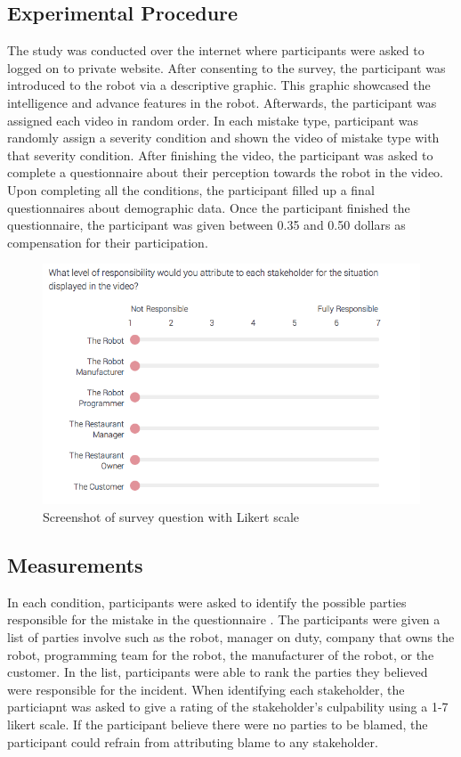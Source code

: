 \documentclass{sigchi}
\begin{document}
\subsection{Experimental Procedure}
The study was conducted over the internet where participants were asked to logged on to private website. After consenting to the survey, the participant was introduced to the robot via a descriptive graphic. This graphic showcased the intelligence and advance features in the robot. Afterwards, the participant was assigned each video in random order. In each mistake type, participant was randomly assign a severity condition and shown the video of mistake type with that severity condition. After finishing the video, the participant was asked to complete a questionnaire about their perception towards the robot in the video. Upon completing all the conditions, the participant filled up a final questionnaires about demographic data. Once the participant finished the questionnaire, the participant was given between 0.35 and 0.50 dollars as compensation for their participation.

\begin{figure}[!h]
\centering
\includegraphics[width=0.9\columnwidth]{Survey}
\caption{Screenshot of survey question with Likert scale}
\label{fig:figure4}
\end{figure}

\subsection{Measurements}
In each condition, participants were asked to identify the possible parties responsible for the mistake in the questionnaire . The participants were given a list of parties involve such as the robot, manager on duty, company that owns the robot, programming team for the robot, the manufacturer of the robot, or the customer. In the list, participants were able to rank the parties they believed were responsible for the incident. When identifying each stakeholder, the particiapnt was asked to give a rating of the stakeholder's culpability using a 1-7 likert scale. If the participant believe there were no parties to be blamed, the participant could refrain from attributing blame to any stakeholder. 
\end{document}
